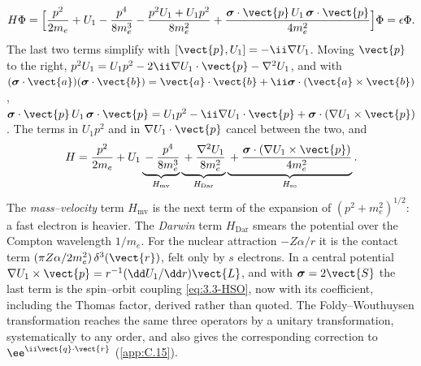 \begin{equation*}
  H\Phi = \Bigl[\frac{p^2}{2m_e} + U_1 - \frac{p^4}{8m_e^3} - \frac{p^2U_1 + U_1p^2}{8m_e^2} + \frac{\boldsymbol{\sigma}\cdot\vect{p}\,U_1\,\boldsymbol{\sigma}\cdot\vect{p}}{4m_e^2}\Bigr]\Phi = \epsilon\Phi .
\end{equation*}
The last two terms simplify with $[\vect{p}, U_1] = -\ii\nabla U_1$. Moving $\vect{p}$ to the right, $p^2U_1 = U_1p^2 - 2\ii\nabla U_1\cdot\vect{p} - \nabla^2U_1$, and with $(\boldsymbol{\sigma}\cdot\vect{a})(\boldsymbol{\sigma}\cdot\vect{b}) = \vect{a}\cdot\vect{b} + \ii\boldsymbol{\sigma}\cdot(\vect{a}\times\vect{b})$, $\boldsymbol{\sigma}\cdot\vect{p}\,U_1\,\boldsymbol{\sigma}\cdot\vect{p} = U_1p^2 - \ii\nabla U_1\cdot\vect{p} + \boldsymbol{\sigma}\cdot(\nabla U_1\times\vect{p})$. The terms in $U_1p^2$ and in $\nabla U_1\cdot\vect{p}$ cancel between the two, and
\begin{equation}
  H = \frac{p^2}{2m_e} + U_1 \underbrace{{}- \frac{p^4}{8m_e^3}}_{H_{\mathrm{mv}}} \underbrace{{}+ \frac{\nabla^2U_1}{8m_e^2}}_{H_{\mathrm{Dar}}} \underbrace{{}+ \frac{\boldsymbol{\sigma}\cdot(\nabla U_1\times\vect{p})}{4m_e^2}}_{H_{\mathrm{so}}} .
  \label{eq:3.5-HBP}
\end{equation}
The \emph{mass--velocity} term $H_{\mathrm{mv}}$ is the next term of the expansion of $(p^2 + m_e^2)^{1/2}$: a fast electron is heavier. The \emph{Darwin} term $H_{\mathrm{Dar}}$ smears the potential over the Compton wavelength $1/m_e$. For the nuclear attraction $-Z\alpha/r$ it is the contact term $(\pi Z\alpha/2m_e^2)\,\delta^3(\vect{r})$, felt only by $s$ electrons. In a central potential $\nabla U_1\times\vect{p} = r^{-1}(\dd U_1/\dd r)\vect{L}$, and with $\boldsymbol{\sigma} = 2\vect{S}$ the last term is the spin--orbit coupling \cref{eq:3.3-HSO}, now with its coefficient, including the Thomas factor, derived rather than quoted. The Foldy--Wouthuysen transformation reaches the same three operators by a unitary transformation, systematically to any order, and also gives the corresponding correction to $\ee^{\ii\vect{q}\cdot\vect{r}}$ (\cref{app:C.15}).

